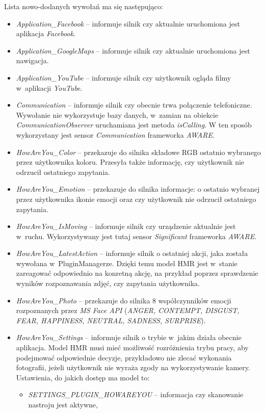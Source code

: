 Lista nowo-dodanych wywołań ma się następująco: 

\begin{itemize}
	\item \textit{Application\_Facebook} -- informuje silnik czy aktualnie uruchomiona jest aplikacja \textit{Facebook}.
	
	\item \textit{Application\_GoogleMaps} -- informuje silnik czy aktualnie uruchomiona jest nawigacja.
	
	\item \textit{Application\_YouTube} -- informuje silnik czy użytkownik ogląda filmy w~aplikacji \textit{YouTube}.
	
	\item \textit{Communication} -- informuje silnik czy obecnie trwa połączenie telefoniczne. Wywołanie nie wykorzystuje bazy danych, w~zamian na obiekcie \textit{CommunicationObserver} uruchamiana jest metoda \textit{isCalling}. W ten sposób wykorzystany jest sensor \textit{Communication} frameworka \textit{AWARE}.
	
	\item \textit{HowAreYou\_Color} -- przekazuje do silnika składowe RGB ostatnio wybranego przez użytkownika koloru. Przesyła także informację, czy użytkownik nie odrzucił ostatniego zapytania.
	
	\item \textit{HowAreYou\_Emotion} -- przekazuje do silnika informacje: o ostatnio wybranej przez użytkownika ikonie emocji oraz czy użytkownik nie odrzucił ostatniego zapytania.
	
	\item \textit{HowAreYou\_IsMoving} -- informuje silnik czy urządzenie aktualnie jest w~ruchu. Wykorzystywany jest tutaj sensor \textit{Significant} frameworka \textit{AWARE}.
	
	\item \textit{HowAreYou\_LatestAction} -- informuje silnik o ostatniej akcji, jaka została wywołana w~PluginManagerze. Dzięki temu model HMR jest w~stanie zareagować odpowiednio na konretną akcję, na przykład poprzez sprawdzenie wyników rozpoznawania zdjęć, czy zapytania użytkownika.
	
	\item \textit{HowAreYou\_Photo} -- przekazuje do silnika 8 współczynników emocji rozpoznanych przez \textit{MS Face API} (\textit{ANGER, CONTEMPT, DISGUST, FEAR, HAPPINESS, NEUTRAL, SADNESS, SURPRISE}).
	
	\item \textit{HowAreYou\_Settings} -- informuje silnik o trybie w~jakim działa obecnie aplikacja. Model HMR musi mieć możliwość rozróżnienia trybu pracy, aby podejmować odpowiednie decyzje, przykładowo nie zlecać wykonania fotografii, jeżeli użytkownik nie wyraża zgody na wykorzystywanie kamery. Ustawienia, do jakich dostęp ma model to:
	\begin{itemize}
		\item \textit{SETTINGS\_PLUGIN\_HOWAREYOU} -- informacja czy skanowanie nastroju jest aktywne, 		 
		

\end{itemize}
\end{itemize}
